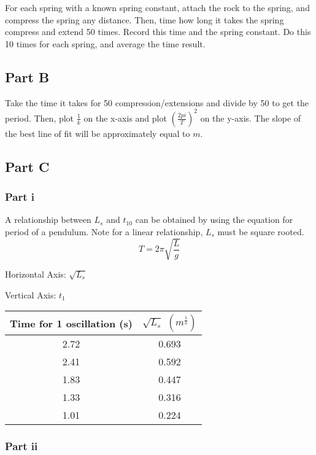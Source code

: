 \documentclass{article}
\begin{document}
For each spring with a known spring constant, attach the rock to the spring, and compress the spring any distance. Then, time how long it takes the spring compress and extend 50 times. Record this time and the spring constant. Do this 10 times for each spring, and average the time result.

\subsection {Part B}

Take the time it takes for 50 compression/extensions and divide by 50 to get the period. Then, plot $\frac{1}{k}$ on the x-axis and plot $(\frac{2pi}{T})^2$ on the y-axis. The slope of the best line of fit will be approximately equal to $m$.

\subsection {Part C}

\subsubsection {Part i}

A relationship between $L_s$ and $t_{10}$ can be obtained by using the equation for period of a pendulum. Note for a linear relationship, $L_s$ must be square rooted.
$$
T = 2\pi\sqrt{\frac{L}{g}}
$$

Horizontal Axis: $\sqrt{L_s}$

Vertical Axis: $t_1$

\begin{center}
  \begin{tabular}{|c|c|}
    \hline
    Time for 1 oscillation (s) & $\sqrt{L_s}$ $(m^\frac{1}{2})$\\
    \hline
    2.72 & 0.693 \\
    \hline
    2.41 & 0.592 \\
    \hline
    1.83 & 0.447 \\
    \hline
    1.33 & 0.316 \\
    \hline
    1.01 & 0.224 \\
    \hline
  \end{tabular}
\end{center}

\subsubsection {Part ii}
\end{document}
